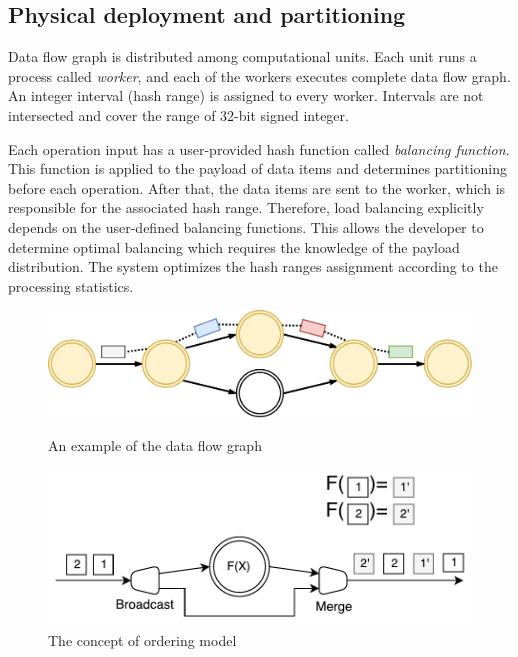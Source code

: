 \subsection{Physical deployment and partitioning}
Data flow graph is distributed among computational units. Each unit runs a process called {\it worker}, and each of the workers executes complete data flow graph. An integer interval (hash range) is assigned to every worker. Intervals are not intersected and cover the range of 32-bit signed integer.

Each operation input has a user-provided hash function called {\it balancing function}. This function is applied to the payload of data items and determines partitioning before each operation. After that, the data items are sent to the worker, which is responsible for the associated hash range. Therefore, load balancing explicitly depends on the user-defined balancing functions. This allows the developer to determine optimal balancing which requires the knowledge of the payload distribution. The system optimizes the hash ranges assignment according to the processing statistics. 

\begin{figure}[ht]
  \centering
  \begin{minipage}[b]{.5\textwidth}
    \centering
    \includegraphics[width=\linewidth]{pics/logical-graph}
    \caption{An example of the data flow graph}
    \label{logical-graph-figure}
  \end{minipage}%
  \begin{minipage}[b]{.5\textwidth}
    \centering
    \includegraphics[width=\linewidth]{pics/ordering}
    \caption{The concept of ordering model}
    \label{ordering}
  \end{minipage}
\end{figure}

